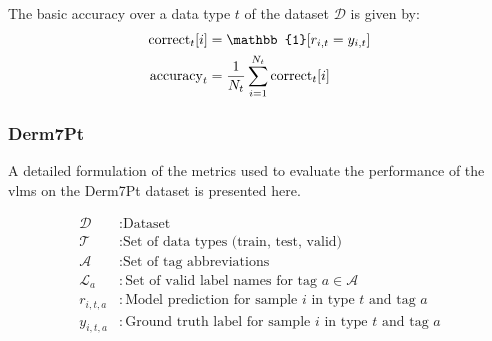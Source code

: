 \documentclass[../ShajiS_RnDReport.tex]{subfiles}
\begin{document}
The basic accuracy over a data type \(t\) of the dataset \(\mathcal{D}\) is given by:
\begin{align}
    \text{correct}_{t}[i] &= \mathbb{1}[r_{i,t} = y_{i,t}] \notag \\
    \text{accuracy}_{t} &= \frac{1}{N_t} \sum_{i=1}^{N_t} \text{correct}_{t}[i]
\end{align}
\label{eq:appendix:metrics:cifar10-accuracy}

\subsubsection{Derm7Pt}
\label{sec:appendix:metrics:derm7pt}
A detailed formulation of the metrics used to evaluate the performance of the \glspl{vlm} on the Derm7Pt dataset is presented here.

\begin{align*}
    \mathcal{D} &\colon \text{Dataset} \\
    \mathcal{T} &\colon \text{Set of data types (train, test, valid)} \\
    \mathcal{A} &\colon \text{Set of tag abbreviations} \\
    \mathcal{L}_a &\colon \text{Set of valid label names for tag } a \in \mathcal{A} \\
    r_{i,t,a} &\colon \text{Model prediction for sample } i \text{ in type } t \text{ and tag } a \\
    y_{i,t,a} &\colon \text{Ground truth label for sample } i \text{ in type } t \text{ and tag } a \\
\end{align*}
\end{document}
